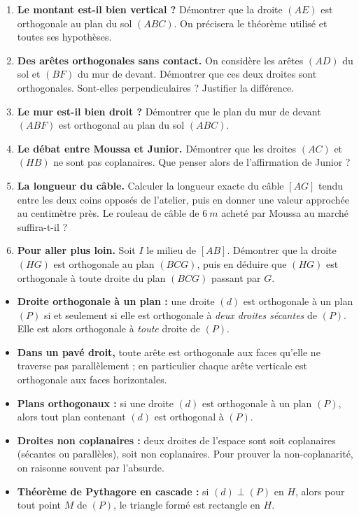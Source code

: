 \documentclass[11pt]{article}
\newcounter{popsec}
\newcounter{popsub}
\newcommand{\courssub}[1]{%
  \stepcounter{popsub}%
  \par\vspace{9pt}\noindent{\popxbold\fontsize{11.5}{13}\selectfont\color{popink}{\color{poporange}\thepopsec.\thepopsub}\hspace{6pt}#1}\par\nopagebreak\vspace{4pt}
}
\begin{document}
\begin{enumerate}
\item \textbf{Le montant est-il bien vertical ?} Démontrer que la droite $(AE)$ est orthogonale au plan du sol $(ABC)$. On précisera le théorème utilisé et toutes ses hypothèses.
\item \textbf{Des arêtes orthogonales sans contact.} On considère les arêtes $(AD)$ du sol et $(BF)$ du mur de devant. Démontrer que ces deux droites sont orthogonales. Sont-elles perpendiculaires ? Justifier la différence.
\item \textbf{Le mur est-il bien droit ?} Démontrer que le plan du mur de devant $(ABF)$ est orthogonal au plan du sol $(ABC)$.
\item \textbf{Le débat entre Moussa et Junior.} Démontrer que les droites $(AC)$ et $(HB)$ ne sont pas coplanaires. Que penser alors de l'affirmation de Junior ?
\item \textbf{La longueur du câble.} Calculer la longueur exacte du câble $[AG]$ tendu entre les deux coins opposés de l'atelier, puis en donner une valeur approchée au centimètre près. Le rouleau de câble de $\SI{6}{m}$ acheté par Moussa au marché suffira-t-il ?
\item \textbf{Pour aller plus loin.} Soit $I$ le milieu de $[AB]$. Démontrer que la droite $(HG)$ est orthogonale au plan $(BCG)$, puis en déduire que $(HG)$ est orthogonale à toute droite du plan $(BCG)$ passant par $G$.
\end{enumerate}

\courssub{Ressources à mobiliser}

\begin{aretenir}
\begin{itemize}
\item \textbf{Droite orthogonale à un plan :} une droite $(d)$ est orthogonale à un plan $(P)$ si et seulement si elle est orthogonale à \emph{deux droites sécantes} de $(P)$. Elle est alors orthogonale à \emph{toute} droite de $(P)$.
\item \textbf{Dans un pavé droit,} toute arête est orthogonale aux faces qu'elle ne traverse pas parallèlement ; en particulier chaque arête verticale est orthogonale aux faces horizontales.
\item \textbf{Plans orthogonaux :} si une droite $(d)$ est orthogonale à un plan $(P)$, alors tout plan contenant $(d)$ est orthogonal à $(P)$.
\item \textbf{Droites non coplanaires :} deux droites de l'espace sont soit coplanaires (sécantes ou parallèles), soit non coplanaires. Pour prouver la non-coplanarité, on raisonne souvent par l'absurde.
\item \textbf{Théorème de Pythagore en cascade :} si $(d) \perp (P)$ en $H$, alors pour tout point $M$ de $(P)$, le triangle formé est rectangle en $H$.
\end{itemize}
\end{aretenir}
\end{document}
